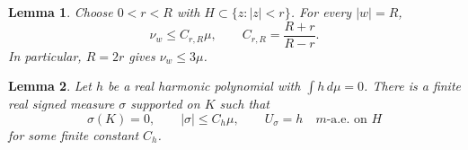 \documentclass[10pt,a4paper]{amsart}
\newtheorem{lemma}{Lemma}
\newcommand{\areaAE}{\text{a.e.}}
\begin{document}
\begin{lemma}\label{lem:harnack}
Choose $0<r<R$ with $H\subset\{z:|z|<r\}$. For every $|w|=R$,
\begin{equation}\label{eq:domination}
 \nu_w\le C_{r,R}\mu,\qquad C_{r,R}=\frac{R+r}{R-r}.
\end{equation}
In particular, $R=2r$ gives $\nu_w\le3\mu$.
\end{lemma}

\begin{lemma}\label{lem:realization}
Let $h$ be a real harmonic polynomial with $\int h\,d\mu=0$.
There is a finite real signed measure $\sigma$ supported on $K$ such that
\begin{equation}\label{eq:realization}
 \sigma(K)=0,\qquad |\sigma|\le C_h\mu,\qquad
 U_\sigma=h\quad m\text{-}\areaAE\text{ on }H
\end{equation}
for some finite constant $C_h$.
\end{lemma}
\end{document}

